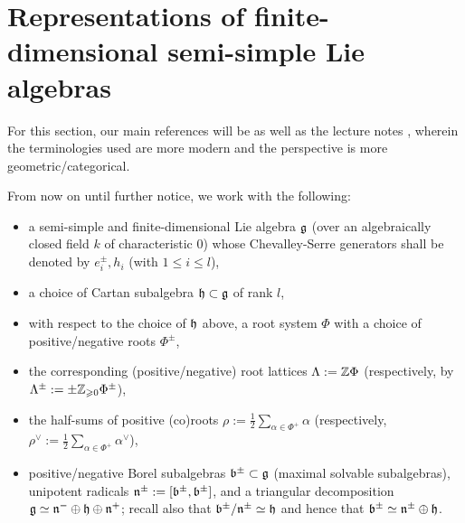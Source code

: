 \section{Representations of finite-dimensional semi-simple Lie algebras}
    For this section, our main references will be \cite[Chapter VI]{humphreys_lie_algebras} as well as the lecture notes \cite{gaitsgory_BB_localisation_notes}, wherein the terminologies used are more modern and the perspective is more geometric/categorical.

    \begin{convention} \label{conv: a_fixed_semi_simple_lie_algebra}
        From now on until further notice, we work with the following:
            \begin{itemize}
                \item a semi-simple and finite-dimensional Lie algebra $\mathfrak{g}$ (over an algebraically closed field $k$ of characteristic $0$) whose Chevalley-Serre generators shall be denoted by $e_i^{\pm}, h_i$ (with $1 \leq i \leq l$),
                \item a choice of Cartan subalgebra $\mathfrak{h} \subset \mathfrak{g}$ of rank $l$,
                \item with respect to the choice of $\mathfrak{h}$ above, a root system $\Phi$ with a choice of positive/negative roots $\Phi^{\pm}$,
                \item the corresponding (positive/negative) root lattices $\Lambda := \mathbb{Z} \Phi$ (respectively, by $\Lambda^{\pm} := \pm \mathbb{Z}_{\geqslant 0} \Phi^{\pm}$), 
                \item the half-sums of positive (co)roots $\rho := \frac12 \sum_{\alpha \in \Phi^+} \alpha$ (respectively, $\rho^{\vee} := \frac12 \sum_{\alpha \in \Phi^+} \alpha^{\vee}$),
                \item positive/negative Borel subalgebras $\mathfrak{b}^{\pm} \subset \mathfrak{g}$ (maximal solvable subalgebras), unipotent radicals $\mathfrak{n}^{\pm} := [\mathfrak{b}^{\pm}, \mathfrak{b}^{\pm}]$, and a triangular decomposition $\mathfrak{g} \simeq \mathfrak{n}^- \oplus \mathfrak{h} \oplus \mathfrak{n}^+$; recall also that $\mathfrak{b}^{\pm}/\mathfrak{n}^{\pm} \simeq \mathfrak{h}$ and hence that $\mathfrak{b}^{\pm} \simeq \mathfrak{n}^{\pm} \oplus \mathfrak{h}$. 
            \end{itemize}
    \end{convention}

